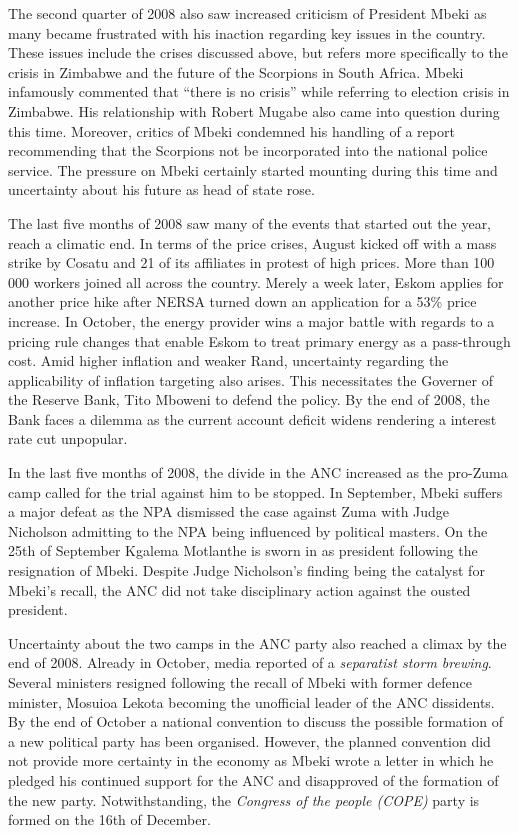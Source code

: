 \documentclass[11pt,preprint, authoryear]{elsarticle}
\numberwithin{equation}{section}
\numberwithin{figure}{section}
\numberwithin{table}{section}
\begin{document}
The second quarter of 2008 also saw increased criticism of President
Mbeki as many became frustrated with his inaction regarding key issues
in the country. These issues include the crises discussed above, but
refers more specifically to the crisis in Zimbabwe and the future of the
Scorpions in South Africa. Mbeki infamously commented that ``there is no
crisis'' while referring to election crisis in Zimbabwe. His
relationship with Robert Mugabe also came into question during this
time. Moreover, critics of Mbeki condemned his handling of a report
recommending that the Scorpions not be incorporated into the national
police service. The pressure on Mbeki certainly started mounting during
this time and uncertainty about his future as head of state rose.

The last five months of 2008 saw many of the events that started out the
year, reach a climatic end. In terms of the price crises, August kicked
off with a mass strike by Cosatu and 21 of its affiliates in protest of
high prices. More than 100 000 workers joined all across the country.
Merely a week later, Eskom applies for another price hike after NERSA
turned down an application for a 53\% price increase. In October, the
energy provider wins a major battle with regards to a pricing rule
changes that enable Eskom to treat primary energy as a pass-through
cost. Amid higher inflation and weaker Rand, uncertainty regarding the
applicability of inflation targeting also arises. This necessitates the
Governer of the Reserve Bank, Tito Mboweni to defend the policy. By the
end of 2008, the Bank faces a dilemma as the current account deficit
widens rendering a interest rate cut unpopular.

In the last five months of 2008, the divide in the ANC increased as the
pro-Zuma camp called for the trial against him to be stopped. In
September, Mbeki suffers a major defeat as the NPA dismissed the case
against Zuma with Judge Nicholson admitting to the NPA being influenced
by political masters. On the 25th of September Kgalema Motlanthe is
sworn in as president following the resignation of Mbeki. Despite Judge
Nicholson's finding being the catalyst for Mbeki's recall, the ANC did
not take disciplinary action against the ousted president.

Uncertainty about the two camps in the ANC party also reached a climax
by the end of 2008. Already in October, media reported of a
\emph{separatist storm brewing}. Several ministers resigned following
the recall of Mbeki with former defence minister, Mosuioa Lekota
becoming the unofficial leader of the ANC dissidents. By the end of
October a national convention to discuss the possible formation of a new
political party has been organised. However, the planned convention did
not provide more certainty in the economy as Mbeki wrote a letter in
which he pledged his continued support for the ANC and disapproved of
the formation of the new party. Notwithstanding, the
\emph{Congress of the people (COPE)} party is formed on the 16th of
December.
\end{document}
